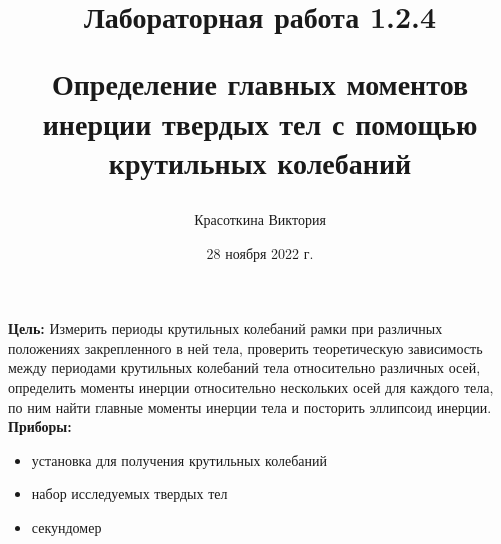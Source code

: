 \documentclass[a4paper,12pt]{article}
\author{Красоткина Виктория}
\title{Лабораторная работа 1.2.4

Определение главных моментов инерции твердых тел с помощью крутильных колебаний}
\date{28 ноября 2022 г.}
\begin{document}
\maketitle
\thispagestyle{empty}

\newpage
\setcounter{page}{1}

\textbf{Цель:}
Измерить периоды крутильных колебаний рамки при различных положениях закрепленного
в ней тела, проверить теоретическую зависимость между периодами крутильных колебаний тела
относительно различных осей, определить моменты инерции относительно нескольких осей для каждого тела, 
по ним найти главные моменты инерции тела и посторить эллипсоид инерции.\\

\textbf{Приборы:}
\begin{itemize}
    \item установка для получения крутильных колебаний
    \item набор исследуемых твердых тел
    \item секундомер
\end{itemize}
\end{document}
